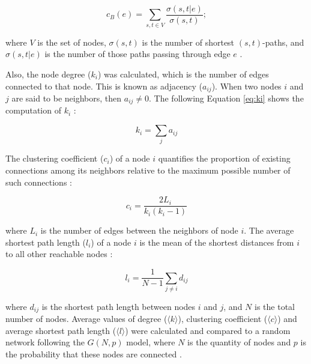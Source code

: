 \documentclass{pssbmac}
\begin{document}
\begin{equation}
c_B(e) = \sum_{s, t \in V} \frac{\sigma(s, t | e)}{\sigma(s, t)}; \label{eq:ebc}
\end{equation}

where $V$ is the set of nodes, $\sigma(s, t)$ is the number of shortest $(s, t)$-paths, and $\sigma(s, t | e)$ is the number of those paths passing through edge $e$ \cite{costaCharacterizationComplexNetworks2007}.

Also, the node degree ($k_i$) was calculated, which is the number of edges connected to that node. This is known as adjacency ($a_{i j}$). When two nodes $i$ and $j$ are said to be neighbors, then $a_{i j} \neq 0$. The following Equation \ref{eq:ki} shows the computation of $k_i$ \cite{costaCharacterizationComplexNetworks2007}:

\begin{equation}
k_i = \sum_j a_{i j} \label{eq:ki}
\end{equation}

The clustering coefficient ($c_i$) of a node $i$ quantifies the proportion of existing connections among its neighbors relative to the maximum possible number of such connections \cite{costaCharacterizationComplexNetworks2007}:

\begin{equation}
c_i = \frac{2 L_i}{k_i (k_i - 1)} \label{eq:ci}
\end{equation}

where $L_i$ is the number of edges between the neighbors of node $i$. The average shortest path length ($l_i$) of a node $i$ is the mean of the shortest distances from $i$ to all other reachable nodes \cite{costaCharacterizationComplexNetworks2007}:

\begin{equation}
l_i = \frac{1}{N - 1} \sum_{j \neq i} d_{ij} \label{eq:li}
\end{equation}

where $d_{ij}$ is the shortest path length between nodes $i$ and $j$, and $N$ is the total number of nodes. Average values of degree ($\langle k \rangle$), clustering coefficient ($\langle c \rangle$) and average shortest path length ($\langle l \rangle$) were calculated and compared to a random network following the $G(N, p)$ model, where $N$ is the quantity of nodes and $p$ is the probability that these nodes are connected \cite{barabasiNetworkScience2016}.

\end{document}
